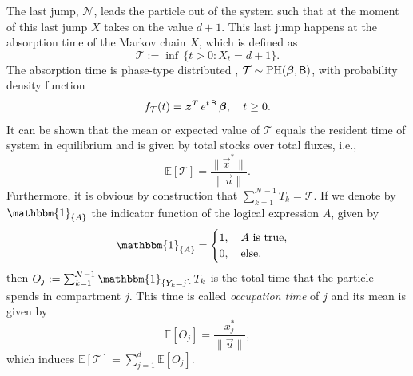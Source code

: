 \documentclass[smallextended]{svjour3}
\makeatletter
\renewcommand*{\eqref}[1]{%
  \hyperref[{#1}]{\textup{\tagform@{\ref*{#1}}}}%
}
\newcommand{\E}{\mathbb{E}}
\newcommand{\TT}{\mathcal{T}}
\newcommand{\PH}{\operatorname{PH}}
\newcommand{\vnorms}[1]{\|#1\|}
\newcommand{\ie}{i.e.}
\newcommand{\pdf}{probability density function}
\makeatother
\begin{document}
The last jump, $\mathcal{N}$, leads the particle out of the system such that at the moment of this last jump $X$ takes on the value $d+1$.
This last jump happens at the absorption time of the Markov chain $X$, which is defined as
\begin{equation*}
   \TT := \inf\,\{t>0: X_t=d+1\}.
\end{equation*}
The absorption time is phase-type distributed \citep{Neuts1981}, $\TT\sim\PH(\vec{\beta},\tens{B})$, with \pdf
\begin{equation*}
  f_{\TT}(t) = \vec{z}^T\,e^{t\,\tens{B}}\,\vec{\beta},\quad t\geq0.
\end{equation*}
It can be shown \citep[Section 3.2]{Metzler2018MGS} that the mean or expected value of $\TT$ equals the resident time \citep{Sierra2016GlobChangBiol} of system \eqref{eqn:lin_CS_sys} in equilibrium and is given by total stocks over total fluxes, \ie, 
\begin{equation*}
  \E\left[\TT\right] = \frac{\vnorms{\vec{x}^\ast}}{\vnorms{\vec{u}}}.
\end{equation*}
Furthermore, it is obvious by construction that $\sum_{k=1}^{\mathcal{N}-1} T_k = \TT$.
If we denote by $\mathbbm{1}_{\{A\}}$ the indicator function of the logical expression $A$, given by
\begin{equation*}
  \mathbbm{1}_{\{A\}} =
  \begin{cases}
    1, \quad A\text{ is true},\\
    0, \quad\text{else},
  \end{cases}
\end{equation*}
then $O_j:=\sum_{k=1}^{\mathcal{N}-1} \mathbbm{1}_{\{Y_k=j\}}\,T_k$ is the total time that the particle spends in compartment $j$.
This time is called \emph{occupation time} of $j$ and its mean is given by \citep[Section 3.3]{Metzler2018MGS}
\begin{equation}
  \label{eqn:occupation_time}
  \E\left[O_j\right] = \frac{x^\ast_j}{\vnorms{\vec{u}}},
\end{equation}
which induces $\E\left[\TT\right] = \sum_{j=1}^d \E\left[O_j\right]$.
\end{document}
